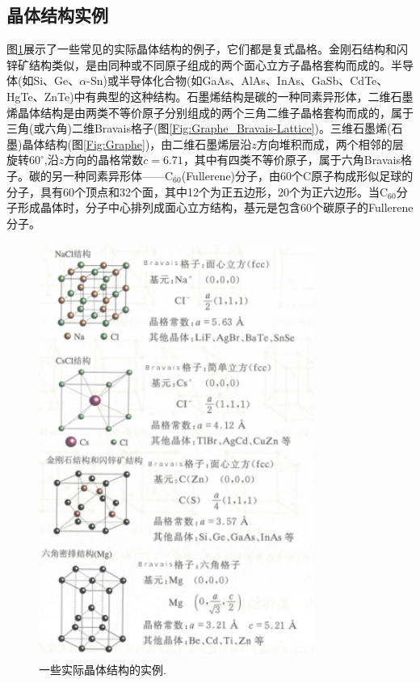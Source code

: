 \subsection{晶体结构实例}
图\ref{Fig:Crystal-structure-example}展示了一些常见的实际晶体结构的例子，它们都是复式晶格。金刚石结构和闪锌矿结构类似，是由同种或不同原子组成的两个面心立方子晶格套构而成的。半导体(如Si、Ge、$\alpha$-Sn)或半导体化合物(如GaAs、AlAs、InAs、GaSb、CdTe、HgTe、ZnTe)中有典型的这种结构。石墨烯结构是碳的一种同素异形体，二维石墨烯晶体结构是由两类不等价原子分别组成的两个三角二维子晶格套构而成的，属于三角(或六角)二维Bravais格子(图\ref{Fig:Graphe_Bravais-Lattice})。三维石墨烯(石墨)晶体结构(图\ref{Fig:Graphe})，由二维石墨烯层沿$z$方向堆积而成，两个相邻的层旋转$60^{\circ}$,沿$z$方向的晶格常数$c=6.71$，其中有四类不等价原子，属于六角Bravais格子。碳的另一种同素异形体——$\mathrm{C}_{60}$(Fullerene)分子，由60个C原子构成形似足球的分子，具有60个顶点和32个面，其中12个为正五边形，20个为正六边形。当$\mathrm{C}_{60}$分子形成晶体时，分子中心排列成面心立方结构，基元是包含60个碳原子的Fullerene分子。
\begin{figure}[h!]
\centering
\vspace*{-0.05in}
\includegraphics[height=5.35in,width=3.55in,viewport=0 0 70 110,clip]{Figures/Crystal_Structure-examples.jpg}
\caption{\small \textrm{一些实际晶体结构的实例.}}%
\label{Fig:Crystal-structure-example}
\end{figure}

